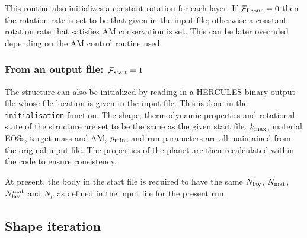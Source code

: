 \documentclass[11pt, oneside]{article}   	%
\begin{document}
This routine also initializes a constant rotation for each layer.
If $\mathcal{F}_{\rm Lconc}=0$ then the rotation rate is set to be that given in the input file; otherwise a constant rotation rate that satisfies AM conservation is set.
This can be later overruled depending on the AM control routine used.

\subsubsection{From an output file: $\mathcal{F}_{\rm start}=1$}
The structure can also be initialized by reading in a HERCULES binary output file whose file location is given in the input file.
This is done in the \texttt{initialisation} function.
The shape, thermodynamic properties and rotational state of the structure are set to be the same as the given start file. $k_{\rm max}$, material EOSs, target mass and AM, $p_{\rm min}$, and run parameters are all maintained from the original input file. 
The properties of the planet are then recalculated within the code to ensure consistency. 

%
\vspace{0.5cm}
\begin{tcolorbox}[colback=white, colframe=SchoolColor, title=Note]
At present, the body in the start file is required to have the same $N_{\rm lay}$, $N_{\rm mat}$, $N_{\rm lay}^{\rm mat}$ and $N_{\mu}$ as defined in the input file for the present run.
\end{tcolorbox}

\subsection{Shape iteration}
\label{HUG:sec:shape}
\end{document}
